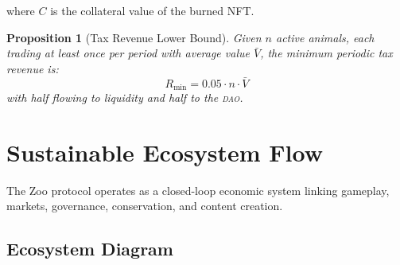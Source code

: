 \documentclass[11pt,letterpaper]{article}
\newtheorem{proposition}[theorem]{Proposition}
\newcommand{\DAO}{\textsc{dao}}
\begin{document}
where $C$ is the collateral value of the burned NFT.

\begin{proposition}[Tax Revenue Lower Bound]
Given $n$ active animals, each trading at least once per period with average value $\bar{V}$, the minimum periodic tax revenue is:
\begin{equation}
R_{\min} = 0.05 \cdot n \cdot \bar{V}
\end{equation}
with half flowing to liquidity and half to the \DAO{}.
\end{proposition}

\section{Sustainable Ecosystem Flow}
\label{sec:ecosystem}

The Zoo protocol operates as a closed-loop economic system linking gameplay, markets, governance, conservation, and content creation.

\subsection{Ecosystem Diagram}
\end{document}
